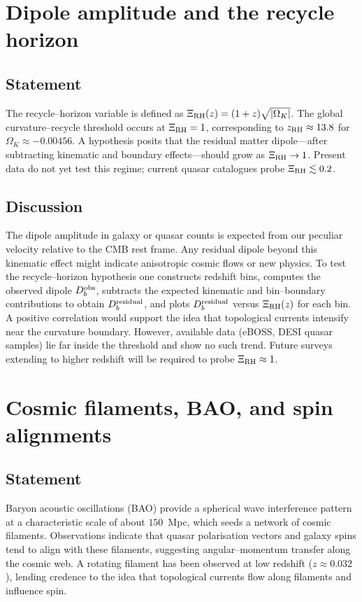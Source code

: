 \documentclass[12pt,a4paper]{article}
\begin{document}
\section{Dipole amplitude and the recycle horizon}
\label{sec:dipole}
\subsection{Statement}
The recycle–horizon variable is defined as $\Xi_{\rm RH}(z) = (1+z)\sqrt{|\Omega_K|}$.  The global curvature–recycle threshold occurs at $\Xi_{\rm RH}=1$, corresponding to $z_{\rm RH} \approx 13.8$ for $\Omega_K \approx -0.00456$.  A hypothesis posits that the residual matter dipole—after subtracting kinematic and boundary effects—should grow as $\Xi_{\rm RH} \to 1$.  Present data do not yet test this regime; current quasar catalogues probe $\Xi_{\rm RH} \lesssim 0.2$.

\subsection{Discussion}
The dipole amplitude in galaxy or quasar counts is expected from our peculiar velocity relative to the CMB rest frame.  Any residual dipole beyond this kinematic effect might indicate anisotropic cosmic flows or new physics.  To test the recycle–horizon hypothesis one constructs redshift bins, computes the observed dipole $D^{\rm obs}_b$, subtracts the expected kinematic and bin–boundary contributions to obtain $D^{\rm residual}_b$, and plots $D^{\rm residual}_b$ versus $\Xi_{\rm RH}(z)$ for each bin.  A positive correlation would support the idea that topological currents intensify near the curvature boundary.  However, available data (eBOSS, DESI quasar samples) lie far inside the threshold and show no such trend.  Future surveys extending to higher redshift will be required to probe $\Xi_{\rm RH}\approx1$.

\section{Cosmic filaments, BAO, and spin alignments}
\label{sec:filaments}
\subsection{Statement}
Baryon acoustic oscillations (BAO) provide a spherical wave interference pattern at a characteristic scale of about $150$~Mpc, which seeds a network of cosmic filaments.  Observations indicate that quasar polarisation vectors and galaxy spins tend to align with these filaments, suggesting angular–momentum transfer along the cosmic web.  A rotating filament has been observed at low redshift ($z\approx0.032$), lending credence to the idea that topological currents flow along filaments and influence spin.
\end{document}
